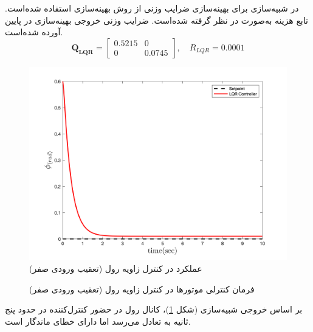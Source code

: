  
 
  در شبیه‌سازی برای بهینه‌سازی ضرایب وزنی  از روش بهینه‌سازی
 \cite{Karimi2010}
استفاده شده‌است.
تابع هزینه  به‌صورت
در نظر گرفته شده‌است. ضرایب وزنی خروجی بهینه‌سازی در پایین آورده شده‌است.
\begin{equation}
	\boldsymbol{Q_{LQR}} = \begin{bmatrix}
		0.5215 & 0\\
		0 & 0.0745
	\end{bmatrix}, \quad R_{LQR} =  0.0001
\end{equation} 
\begin{figure}[H]
	\includegraphics[width=.48\linewidth]{../Figures/MIL/LQR/Roll/lqr_roll_nn.png}
	\centering
	\caption{عملكرد  در کنترل زاويه رول (تعقیب ورودی صفر)}
	\label{lqr_roll_figure_simulation}
\end{figure}
\begin{figure}[H]
	\centering
	\caption{‫‪فرمان کنترلی موتورها در کنترل زاویه رول (تعقیب ورودی صفر)}
\end{figure}


بر اساس خروجی شبیه‌سازی (شکل
\ref{lqr_roll_figure_simulation})،
کانال رول در حضور کنترل‌کننده  در حدود پنج ثانیه به تعادل می‌رسد اما دارای خطای ماندگار است. 